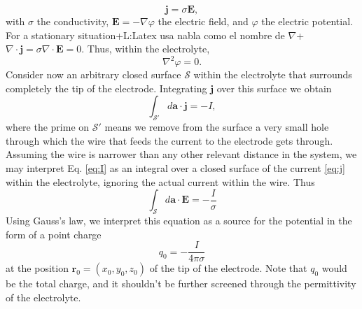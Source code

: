 \documentclass{article}
\newcommand{\notaL}[1]{{\color{blue}+L:#1+}}
\begin{document}
\begin{equation}
  \label{eq:j}
  \bm j=\sigma\bm E,
\end{equation}
with
$\sigma$ the conductivity, $\bm E=-\nabla\varphi$ the electric field,
and $\varphi$ the electric potential. For a
stationary situation\notaL{Latex usa nabla como el nombre de
  $\nabla$}
$\nabla\cdot \bm j = \sigma\nabla\cdot\bm E=0$. Thus, within the electrolyte,
\begin{equation}
  \label{eq:laplace}
\nabla^{2} \varphi=0.
\end{equation}
Consider now an arbitrary closed surface
$\mathcal S$
within the electrolyte that surrounds completely the tip of the
electrode. Integrating $ \bm j$ over this surface we obtain
\begin{equation}
  \label{eq:I}
\int_{\mathcal S'} d\bm a \cdot \bm j = -I,
\end{equation}
where the prime on $\mathcal S'$ means we remove from the surface a
very small hole through which the wire that feeds the current to the
electrode gets
through. Assuming the wire is narrower than any other relevant
distance in the system, we may interpret Eq. \eqref{eq:I} as an
integral over a closed surface of the current \eqref{eq:j} within the
electrolyte, ignoring the actual current within the wire. Thus
\begin{equation}
  \label{eq:gauss}
  \int_{\mathcal S} d\bm a \cdot \bm E = -\frac{I}{\sigma}
\end{equation}
Using Gauss's law, we interpret this equation as a source for the
potential in the form of a point charge
\begin{equation}
  q_0 = -\frac{I}{4 \pi \sigma}
\end{equation}
at the position $\bm r_0=(x_0, y_0, z_0)$ of the
tip of the electrode. Note that $q_0$ would be the total charge,
and it shouldn't be further screened through the permittivity of the
electrolyte.
\end{document}
